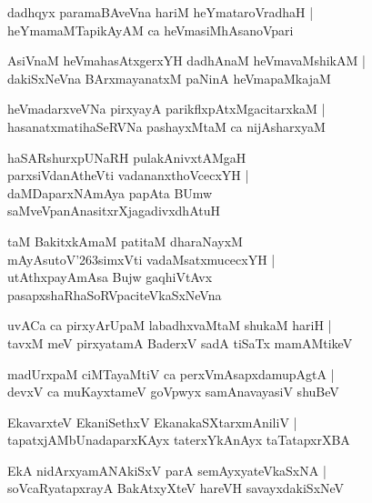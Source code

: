 \documentclass[twoside,12pt,openright]{book}
\def\S{\char'263}
\newcounter{shloka}[chapter]
\begin{document}
\begin{shloka}%
dadhqyx paramaBAveVna hariM heYmataroVradhaH |\\
heYmamaMTapikAyAM ca heVmasiMhAsanoVpari
\end{shloka}

\begin{shloka}%
AsiVnaM heVmahasAtxgerxYH dadhAnaM heVmavaMshikAM |\\
dakiSxNeVna BArxmayanatxM paNinA heVmapaMkajaM 
\end{shloka}

\begin{shloka}%
heVmadarxveVNa pirxyayA parikflxpAtxMgacitarxkaM |\\
hasanatxmatihaSeRVNa pashayxMtaM ca nijAsharxyaM 
\end{shloka}

\begin{shloka}%
haSARshurxpUNaRH pulakAnivxtAMgaH \\
parxsiVdanAtheVti vadananxthoVcecxYH |\\
daMDaparxNAmAya papAta BUmw \\
saMveVpanAnasitxrXjagadivxdhAtuH 
\end{shloka}

\begin{shloka}%
taM BakitxkAmaM patitaM dharaNayxM \\
mAyAsutoV\S simxVti vadaMsatxmucecxYH |\\
utAthxpayAmAsa Bujw gaqhiVtAvx \\
pasapxshaRhaSoRVpaciteVkaSxNeVna 
\end{shloka}

\begin{shloka}%
uvACa ca pirxyArUpaM labadhxvaMtaM shukaM hariH |\\
tavxM meV pirxyatamA BaderxV sadA tiSaTx mamAMtikeV 
\end{shloka}

\begin{shloka}%
madUrxpaM ciMTayaMtiV ca perxVmAsapxdamupAgtA |\\
devxV ca muKayxtameV goVpwyx samAnavayasiV shuBeV  
\end{shloka}

\begin{shloka}%
EkavarxteV EkaniSethxV EkanakaSXtarxmAniliV |\\
tapatxjAMbUnadaparxKAyx taterxYkAnAyx taTatapxrXBA
\end{shloka}

\begin{shloka}%
EkA nidArxyamANAkiSxV parA semAyxyateVkaSxNA |\\
soVcaRyatapxrayA BakAtxyXteV hareVH savayxdakiSxNeV 
\end{shloka}
\end{document}
